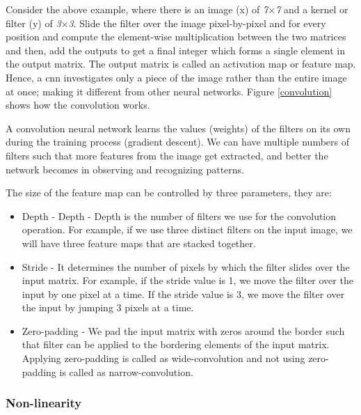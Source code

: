 Consider the above example, where there is an image (x) of \textit{7$\times$7} and a kernel or filter (y) of \textit{3$\times$3}. Slide the filter over the image pixel-by-pixel and for every position and compute the element-wise multiplication between the two matrices and then, add the outputs to get a final integer which forms a single element in the output matrix. The output matrix is called an activation map or feature map. Hence, a \ac{cnn} investigates only a piece of the image rather than the entire image at once; making it different from other neural networks. Figure \ref{convolution} shows how the convolution works. 

\par

A convolution neural network learns the values (weights) of the filters on its own during the training process (gradient descent). We can have multiple numbers of filters such that more features from the image get extracted, and better the network becomes in observing and recognizing patterns. 

The size of the feature map can be controlled by three parameters, they are:

\begin{itemize}
    \item Depth - Depth - Depth is the number of filters we use for the convolution operation. For example, if we use three distinct filters on the input image, we will have three feature maps that are stacked together. 
    
    \item  Stride - It determines the number of pixels by which the filter slides over the input matrix. For example, if the stride value is 1, we move the filter over the input by one pixel at a time. If the stride value is 3, we move the filter over the input by jumping 3 pixels at a time.
    
    \item Zero-padding - We pad the input matrix with zeros around the border such that filter can be applied to the bordering elements of the input matrix. Applying zero-padding is called as wide-convolution and not using zero-padding is called as narrow-convolution.
    
\end{itemize}

\subsubsection{Non-linearity}

